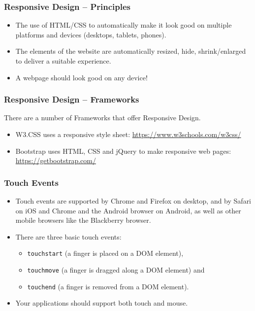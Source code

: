 \documentclass[screen, aspectratio=43]{beamer}
\begin{document}
%
\begin{frame}
\frametitle{Responsive Design -- Principles}
\begin{itemize}
\item The use of HTML/CSS to automatically make it look good on multiple platforms and devices (desktops, tablets, phones).
\item The elements of the website are automatically resized, hide, shrink/enlarged to deliver a suitable experience.
\item A webpage should look good on any device!
\vspace{10 mm}
\end{itemize}
\end{frame}
%
\begin{frame}
\frametitle{Responsive Design -- Frameworks}
There are a number of Frameworks that offer Responsive Design.
\begin{itemize}
\item W3.CSS uses a responsive style sheet: \url{https://www.w3schools.com/w3css/}
\item Bootstrap uses HTML, CSS and jQuery to make responsive web pages: \url{https://getbootstrap.com/}
\end{itemize}
\end{frame}
%
\begin{frame}
\frametitle{Touch Events}
\begin{itemize}
\item Touch events are supported by Chrome and Firefox on desktop, and by Safari on iOS and Chrome and the Android browser on Android, as well as other mobile browsers like the Blackberry browser.
\item There are three basic touch events: 
\begin{itemize}
\item \texttt{touchstart} (a finger is placed on a DOM element), 
\item \texttt{touchmove} (a finger is dragged along a DOM element) and 
\item \texttt{touchend} (a finger is removed from a DOM element).
\end{itemize}
\item Your applications should support both touch and mouse.
\vspace{10 mm}
\end{itemize}
\end{frame}
\end{document}
